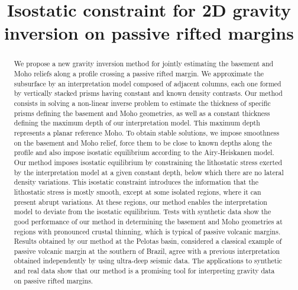 \documentclass[manuscript]{geophysics}
\begin{document}
\title{Isostatic constraint for 2D gravity inversion on passive rifted margins}

\renewcommand{\thefootnote}{\fnsymbol{footnote}} 




\maketitle

\begin{abstract}

We propose a new gravity inversion method for jointly estimating the basement and 
Moho reliefs along a profile crossing a passive rifted margin.
We approximate the subsurface by an interpretation model composed of 
adjacent columns, each one formed by vertically stacked prisms having constant 
and known density contrasts.
Our method consists in solving a non-linear inverse problem to estimate the 
thickness of specific prisms defining the basement and Moho geometries, 
as well as a constant thickness defining the maximum depth of our interpretation 
model.
This maximum depth represents a planar reference Moho.
To obtain stable solutions, we impose smoothness on the basement and Moho relief,
force them to be close to known depths along the profile and also impose
isostatic equilibrium according to the Airy-Heiskanen model.
Our method imposes isostatic equilibrium by constraining the lithostatic stress 
exerted by the interpretation model at a given constant depth, 
below which there are no lateral density variations.
This isostatic constraint introduces the information that the lithostatic stress 
is mostly smooth, except at some isolated regions, where it can present abrupt 
variations. At these regions, our method enables the interpretation model to deviate
from the isostatic equilibrium.
Tests with synthetic data show the good performance of our method in
determining the basement and Moho geometries at regions with  
pronounced crustal thinning, which is typical of passive volcanic margins.
Results obtained by our method at the Pelotas basin, considered a classical example
of passive volcanic margin at the southern of Brazil, agree with a previous
interpretation obtained independently by using ultra-deep seismic data.
The applications to synthetic and real data show that our method is a
promising tool for interpreting gravity data on passive rifted margins.


\end{abstract}
\end{document}
